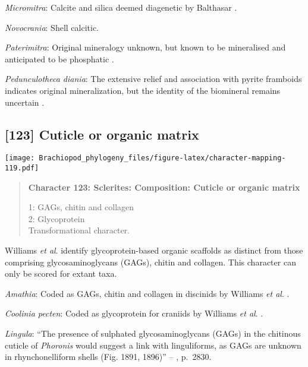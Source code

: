\documentclass[openany]{book}
\theoremstyle{definition}
\theoremstyle{definition}
\theoremstyle{definition}
\theoremstyle{remark}
\begin{document}
\hypertarget{Micromitra-coding-122}{}
\emph{Micromitra}: Calcite and silica deemed diagenetic by Balthasar
\citeyearpar{Balthasar2004Shellstructure}.

\hypertarget{Novocrania-coding-122}{}
\emph{Novocrania}: Shell calcitic.

\hypertarget{Paterimitra-coding-122}{}
\emph{Paterimitra}: Original mineralogy unknown, but known to be
mineralised and anticipated to be phosphatic
\citep{Holmer2009Theenigmatic}.

\hypertarget{Pedunculotheca_diania-coding-122}{}
\emph{Pedunculotheca diania}: The extensive relief and association with
pyrite framboids indicates original mineralization, but the identity of
the biomineral remains uncertain \citep{Zhang2013}.

\subsection*{{[}123{]} Cuticle or organic
matrix}\label{cuticle-or-organic-matrix}

\texttt{[image: Brachiopod\_phylogeny\_files/figure-latex/character-mapping-119.pdf]}

\begin{quote}
\textbf{Character 123: Sclerites: Composition: Cuticle or organic
matrix}

1: GAGs, chitin and collagen\\
2: Glycoprotein\\
Transformational character.
\end{quote}

Williams \emph{et al}. \citeyearpar{Williams1996Asupra} identify
glycoprotein-based organic scaffolds as distinct from those comprising
glycosaminoglycans (GAGs), chitin and collagen. This character can only
be scored for extant taxa.

\hypertarget{Amathia-coding-123}{}
\emph{Amathia}: Coded as GAGs, chitin and collagen in discinids by
Williams \emph{et al}. \citeyearpar{Williams1996Asupra}.

\hypertarget{Coolinia_pecten-coding-123}{}
\emph{Coolinia pecten}: Coded as glycoprotein for craniids by Williams
\emph{et al}. \citeyearpar{Williams1996Asupra}.

\hypertarget{Lingula-coding-123}{}
\emph{Lingula}: ``The presence of sulphated glycosaminoglycans (GAGs) in
the chitinous cuticle of \emph{Phoronis}
\citep[p.~215]{Herrmann1997Phoronida} would suggest a link with
linguliforms, as GAGs are unknown in rhynchonelliform shells (Fig. 1891,
1896)'' -- \citet{Williams2007Supplement}, p.~2830.
\end{document}

